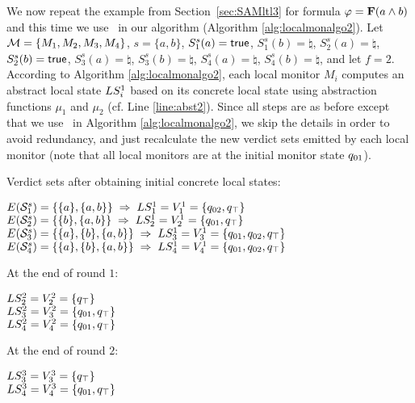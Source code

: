 We now repeat the example from Section~\ref{sec:SAMltl3} for formula $\varphi = 
\mathbf{F}(a \wedge b)$ and this time we use \Exltl~in our algorithm (Algorithm 
\ref{alg:localmonalgo2}). Let $\mathcal{M}=\{M_1, M_2, M_3, M_4\}$, $s=\{a,b\}$, 
$S^s_1(a) = \mathsf{true}$, $S^s_1(b)=\natural$, $S^s_2(a)=\natural$, $S^s_2(b)=\mathsf{true}$, 
$S^s_3(a) =\natural$, $S^s_3(b) =\natural$,  $S^s_4(a) =\natural$, $S^s_4(b) 
=\natural$, and let $f=2$. According to Algorithm \ref{alg:localmonalgo2}, each 
local monitor $M_i$ computes an abstract local state $LS_i^1$ based on its 
concrete local state using abstraction functions $\mu_1$ and $\mu_2$ (cf. Line \ref{line:abst2}). Since all steps are as before except that we use \Exltl~in Algorithm \ref{alg:localmonalgo2}, we skip the details in order to avoid redundancy, and just recalculate the new verdict sets emitted by each local monitor (note that all local monitors are at the initial monitor state $q_{01}$). 

Verdict sets after obtaining initial concrete local states: 

\begin{center}
$E (\mathcal{S}_1^s) = \{\{a\}, \{a,b\}\} \; \Rightarrow \; LS_1^1 
= V_1^1 =  \{q_{02}, q_\top\}$ 
$E (\mathcal{S}_2^s) = \{\{b\}, \{a,b\}\} \; \Rightarrow \; LS_2^1 
= V_2^1 =  \{q_{01}, q_\top\}$ 
$E (\mathcal{S}_3^s) = \{\{a\}, \{b\}, \{a,b\}\} \; \Rightarrow \;
LS_3^1 = V_3^1 =  \{q_{01}, q_{02}, 
q_\top\}$ 
$E (\mathcal{S}_4^s) = \{\{a\}, \{b\}, \{a,b\}\} \; \Rightarrow \;
LS_4^1 = V_4^1 =  \{q_{01}, q_{02}, 
q_\top\}$ 
\end{center}

At the end of round $1$: 

\begin{center}
$ LS_2^2 = V_2^2 =  \{q_\top\}$ \\
$ LS_3^2 = V_3^2 =  \{q_{01}, q_\top\}$ \\
$ LS_4^2 = V_4^2 =  \{q_{01}, q_\top\}$ 
\end{center}


At the end of round $2$: 

\begin{center} 
$ LS_3^3 = V_3^3 =  \{q_\top\}$ \\
$ LS_4^3 = V_4^3 =  \{q_{01}, q_\top\}$ 
\end{center}



